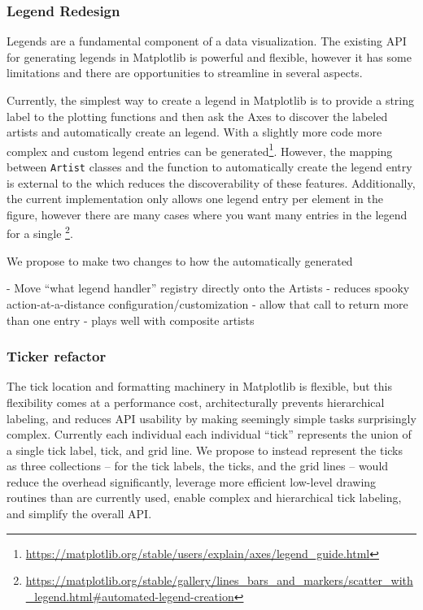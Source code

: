 \documentclass[12pt]{article}
\numberwithin{page}{section}
\begin{document}
\subsubsection{Legend Redesign}

Legends are a fundamental component of a data visualization.  The existing API
for generating legends in Matplotlib is powerful and flexible, however it has
some limitations and there are opportunities to streamline in several aspects.

Currently, the simplest way to create a legend in Matplotlib is to provide a
string label to the plotting functions and then ask the Axes to discover the
labeled artists and automatically create an legend.  With a slightly more code
more complex and custom legend entries can be
generated\footnote{\url{https://matplotlib.org/stable/users/explain/axes/legend\_guide.html}}.
However, the mapping between \texttt{Artist} classes and the function to
automatically create the legend entry is external to the  which
reduces the discoverability of these features.  Additionally, the current
implementation only allows one legend entry per element in the figure, however
there are many cases where you want many entries in the legend for a single
\footnote{\url{https://matplotlib.org/stable/gallery/lines_bars_and_markers/scatter_with_legend.html#automated-legend-creation}}.

We propose to make two changes to how the automatically generated



- Move ``what legend handler'' registry directly onto the Artists
  - reduces spooky action-at-a-distance configuration/customization
- allow that call to return more than one entry
  - plays well with composite artists

\subsubsection{Ticker refactor}

The tick location and formatting machinery in Matplotlib is flexible, but this
flexibility comes at a performance cost, architecturally prevents hierarchical
labeling, and reduces API usability by making seemingly simple tasks
surprisingly complex.  Currently each individual each individual ``tick''
represents the union of a single tick label, tick, and grid line.  We propose to instead
represent the ticks as three collections  -- for the tick labels, the ticks, and
the grid lines -- would reduce the overhead significantly,  leverage more
efficient low-level drawing routines than are currently used, enable complex and hierarchical
tick labeling, and simplify the overall API.
\end{document}
